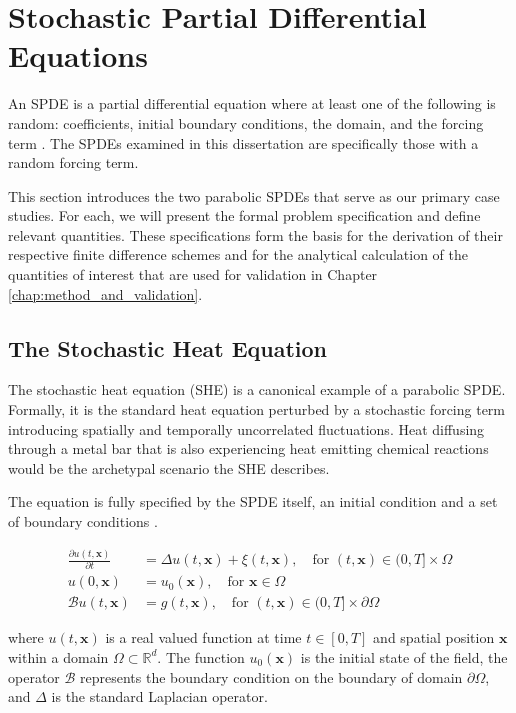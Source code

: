 \section{Stochastic Partial Differential Equations}

An SPDE is a partial differential equation
where at least one of the following is random: coefficients, 
initial boundary conditions, the domain, and the forcing term 
\cite{lototsky2017stochastic}. The SPDEs examined in this dissertation
are specifically those with a random forcing term.

This section introduces the two parabolic SPDEs that 
serve as our primary case studies. For each, we 
will present the formal problem specification and define relevant 
quantities. These specifications form the basis for the derivation
of their respective finite difference schemes and for the analytical 
calculation of the quantities of interest that are used for 
validation in Chapter \ref{chap:method_and_validation}.

\subsection{The Stochastic Heat Equation}

The stochastic heat equation (SHE) is a canonical example of a parabolic SPDE.
Formally, it is the standard heat equation perturbed by a stochastic
forcing term introducing spatially and temporally uncorrelated 
fluctuations. Heat diffusing through a metal bar 
that is also experiencing heat emitting chemical reactions would be the archetypal
scenario the SHE describes.

The equation is fully specified by the SPDE itself, an initial condition and 
a set of boundary conditions \cite{lototsky2017stochastic,pardoux2021stochastic}.

\begin{align}\label{eq:she_spde}
\frac{\partial u(t,\mathbf{x})}{\partial t} &= \Delta u(t,\mathbf{x}) + \xi(t,\mathbf{x}), 
\quad \text{for } (t, \mathbf{x}) \in (0, T] \times \Omega \tag{SHE} \\
u(0, \mathbf{x}) &= u_0(\mathbf{x}), \quad \text{for } \mathbf{x} \in \Omega \nonumber \\
\mathcal{B}u(t, \mathbf{x}) &= g(t, \mathbf{x}), \quad \text{for } 
(t, \mathbf{x}) \in (0, T] \times \partial \Omega \nonumber
\end{align}

where $u(t,\mathbf{x})$ is a real valued function at time $t \in [0, T]$ and 
spatial position $\mathbf{x}$ within a domain $\Omega \subset \mathbb{R}^d$. 
The function $u_0(\mathbf{x})$ is the initial state of the field,
the operator $\mathcal{B}$ represents the boundary condition on the boundary of domain 
$\partial \Omega$, and $\Delta$ is the standard Laplacian operator.

